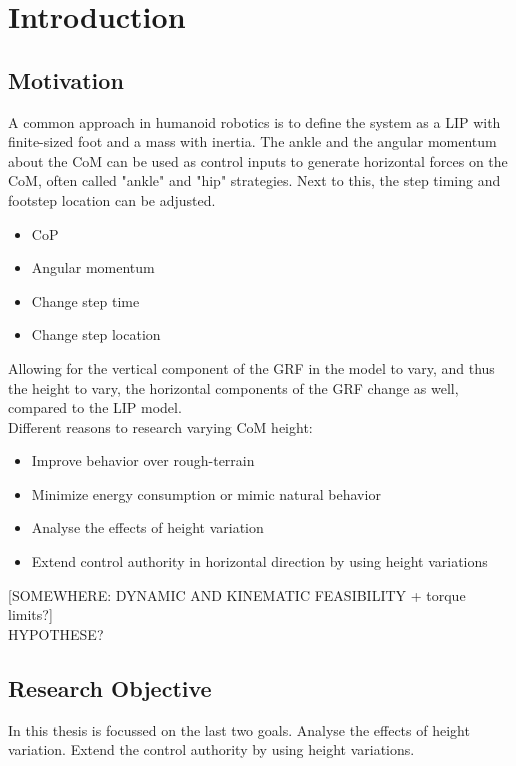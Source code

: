 %
\chapter{Introduction} \label{chap::intro}
\section{Motivation}
A common approach in humanoid robotics is to define the system as a \ac{LIP} with finite-sized foot and a mass with inertia. The ankle and the angular momentum about the \ac{CoM} can be used as control inputs to generate horizontal forces on the \ac{CoM}, often called "ankle" and "hip" strategies.  Next to this, the step timing and footstep location can be adjusted.
\begin{itemize}
	\item \ac{CoP}
	\item Angular momentum
\end{itemize}
\begin{itemize}
	\item Change step time
	\item Change step location
\end{itemize}

Allowing for the vertical component of the \ac{GRF} in the model to vary, and thus the height to vary, the horizontal components of the \ac{GRF} change as well, compared to the \ac{LIP} model.\\
Different reasons to research varying \ac{CoM} height: 
\begin{itemize}
	\item Improve behavior over rough-terrain
	\item Minimize energy consumption or mimic natural behavior
	\item Analyse the effects of height variation
	\item Extend control authority in horizontal direction by using height variations
\end{itemize}

[SOMEWHERE: DYNAMIC AND KINEMATIC FEASIBILITY + torque limits?]\\
HYPOTHESE?
\section{Research Objective}
In this thesis is focussed on the last two goals. Analyse the effects of height variation. Extend the control authority by using height variations. 

